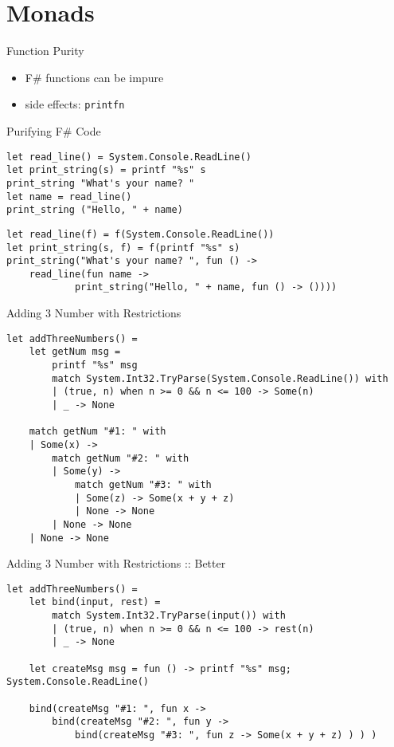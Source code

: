 \documentclass{beamer}
\begin{document}
\section{Monads}
\frame{\tableofcontents[currentsection]}

\begin{frame}[fragile]{Function Purity}
  \begin{itemize}[<+->]
    \item F\# functions can be impure
    \item side effects: \texttt{printfn}
  \end{itemize}
\end{frame}

\begin{frame}[fragile]{Purifying F\# Code}
  \small
  \begin{verbatim}
let read_line() = System.Console.ReadLine()
let print_string(s) = printf "%s" s
print_string "What's your name? "
let name = read_line()
print_string ("Hello, " + name)
  \end{verbatim}
  \pause
  \begin{verbatim}
let read_line(f) = f(System.Console.ReadLine())
let print_string(s, f) = f(printf "%s" s)
print_string("What's your name? ", fun () ->
    read_line(fun name ->
            print_string("Hello, " + name, fun () -> ())))
  \end{verbatim}
\end{frame}

\begin{frame}[fragile]{Adding 3 Number with Restrictions}
  \tiny
  \begin{verbatim}
let addThreeNumbers() =
    let getNum msg =
        printf "%s" msg
        match System.Int32.TryParse(System.Console.ReadLine()) with
        | (true, n) when n >= 0 && n <= 100 -> Some(n)
        | _ -> None
 
    match getNum "#1: " with
    | Some(x) ->
        match getNum "#2: " with
        | Some(y) ->
            match getNum "#3: " with
            | Some(z) -> Some(x + y + z)
            | None -> None
        | None -> None
    | None -> None
  \end{verbatim}
\end{frame}

\begin{frame}[fragile]{Adding 3 Number with Restrictions :: Better}
  \tiny
  \begin{verbatim}
let addThreeNumbers() =
    let bind(input, rest) =
        match System.Int32.TryParse(input()) with
        | (true, n) when n >= 0 && n <= 100 -> rest(n)
        | _ -> None

    let createMsg msg = fun () -> printf "%s" msg; System.Console.ReadLine()

    bind(createMsg "#1: ", fun x ->
        bind(createMsg "#2: ", fun y ->
            bind(createMsg "#3: ", fun z -> Some(x + y + z) ) ) )
  \end{verbatim}
\end{frame}
\end{document}
